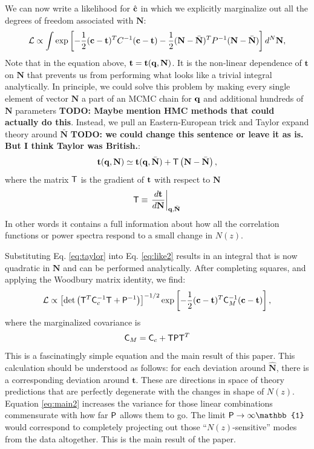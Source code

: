 \documentclass[a4paper,11pt]{article}
\newcommand{\todo}[1]{{\bf TODO: #1}}
\newcommand{\vt}{\mathbf{t}}
\newcommand{\vN}{\mathbf{N}}
\begin{document}
      We can now write a likelihood for $\hat{\bf c}$ in which we explicitly marginalize out all the degrees of freedom associated with $\vN$:
      \begin{equation}
        \mathcal{L} \propto  \int \exp\left [-\frac{1}{2} ({\bf c}-\vt)^T C^{-1} ({\bf c}-\vt) -\frac{1}{2} (\vN - \bar{\vN})^T P^{-1} (\vN -\bar{\vN}) \right]  d^N\vN, \label{eq:like2}
      \end{equation}
      Note that in the equation above, $\vt=\vt({\bf q},\vN)$. It is the non-linear dependence of $\vt$ on $\vN$ that prevents us from performing what looks like a trivial integral analytically. In principle, we could solve this problem by making every single element of vector $\vN$ a part of an MCMC chain for ${\bf q}$ and additional hundreds of $\vN$ parameters \todo{Maybe mention HMC methods that could actually do this}. Instead, we pull an Eastern-European trick and Taylor expand theory around $\bar{\vN}$ \todo{we could change this sentence or leave it as is. But I think Taylor was British.}:
      \begin{equation}
        \vt({\bf q},\vN) \simeq \vt({\bf q},\bar{\vN}) + {\sf T} \left(\vN - \bar{\vN} \right), \label{eq:taylor}
      \end{equation}
      where the matrix ${\sf T}$ is the gradient of ${\bf t}$ with respect to $\vN$
      \begin{equation}
        {\sf T}\equiv \left.\frac{d{\bf t}}{d\vN}\right|_{{\bf q},\bar{\vN}}
      \end{equation}
      In other words it contains a full information about how all the correlation functions or power spectra respond to a small change in $N(z)$.

      Substituting Eq. \ref{eq:taylor} into Eq. \ref{eq:like2} results in an integral that is now quadratic in $\vN$ and can be performed analytically. After completing squares, and applying the Woodbury matrix identity, we find:
      \begin{equation}
        \mathcal{L} \propto \left[{\rm det}\left({\sf T}^T {\sf C}_c^{-1} {\sf T} +{\sf P}^{-1}\right)\right]^{-1/2} \exp\left [-\frac{1}{2} ({\bf c}-\vt)^T {\sf C}_M^{-1} ({\bf c}-\vt) \right], \label{eq:main1}
      \end{equation}
      where the  marginalized covariance is
      \begin{equation}
        {\sf C}_M = {\sf C}_c + {\sf T}{\sf P}{\sf T}^T \label{eq:main2}
      \end{equation}
      This is a fascinatingly simple equation and the main result of this paper. This calculation should be understood as follows: for each deviation around $\hat{\vN}$, there is a corresponding deviation around $\vt$. These are directions in space of theory predictions that are perfectly degenerate with the changes in shape of $N(z)$.  Equation \ref{eq:main2}  increases the variance for those linear combinations commensurate with how far ${\sf P}$ allows them to go. The limit ${\sf P}\rightarrow\infty\mathbb{1}$ would correspond to completely projecting out those ``$N(z)$-sensitive'' modes from the data altogether. This is the main result of the paper.
\end{document}
